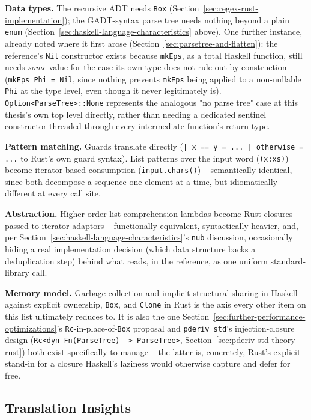 \textbf{Data types.} The recursive ADT needs \texttt{Box}
(Section~\ref{sec:regex-rust-implementation}); the GADT-syntax parse tree
needs nothing beyond a plain \texttt{enum}
(Section~\ref{sec:haskell-language-characteristics} above). One further
instance, already noted where it first arose
(Section~\ref{sec:parsetree-and-flatten}): the reference's \texttt{Nil}
constructor exists because \texttt{mkEps}, as a total Haskell function,
still needs \emph{some} value for the case its own type does not rule
out by construction (\texttt{mkEps Phi = Nil}, since nothing prevents
\texttt{mkEps} being applied to a non-nullable \texttt{Phi} at the type
level, even though it never legitimately is). \texttt{Option<ParseTree>::None}
represents the analogous "no parse tree" case at this thesis's own
top level directly, rather than needing a dedicated sentinel constructor
threaded through every intermediate function's return type.

\textbf{Pattern matching.} Guards translate directly
(\texttt{| x == y = ... | otherwise = ...} to Rust's own guard syntax).
List patterns over the input word (\texttt{(x:xs)}) become iterator-based
consumption (\texttt{input.chars()}) -- semantically identical, since
both decompose a sequence one element at a time, but idiomatically
different at every call site.

\textbf{Abstraction.} Higher-order list-comprehension lambdas become Rust
closures passed to iterator adaptors -- functionally equivalent,
syntactically heavier, and, per
Section~\ref{sec:haskell-language-characteristics}'s \texttt{nub}
discussion, occasionally hiding a real implementation decision (which
data structure backs a deduplication step) behind what reads, in the
reference, as one uniform standard-library call.

\textbf{Memory model.} Garbage collection and implicit structural sharing
in Haskell against explicit ownership, \texttt{Box}, and \texttt{Clone}
in Rust is the axis every other item on this list ultimately reduces to.
It is also the one Section~\ref{sec:further-performance-optimizations}'s
\texttt{Rc}-in-place-of-\texttt{Box} proposal and
\texttt{pderiv\_std}'s injection-closure design
(\texttt{Rc<dyn Fn(ParseTree) -> ParseTree>},
Section~\ref{sec:pderiv-std-theory-rust}) both exist specifically to
manage -- the latter is, concretely, Rust's explicit stand-in for a
closure Haskell's laziness would otherwise capture and defer for free.

\subsection{Translation Insights}
\label{sec:translation-insights}

